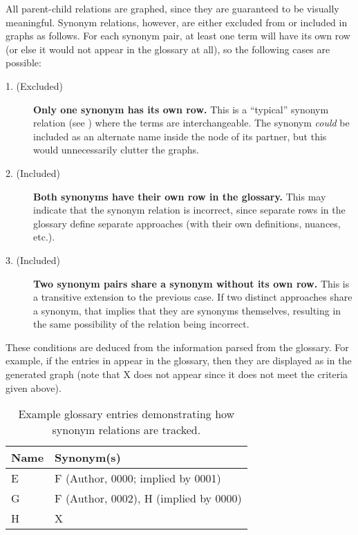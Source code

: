     \newpage\fi
All parent-child relations are graphed, since they are guaranteed to be
visually meaningful. Synonym relations, however, are either excluded from or
included in graphs as follows. For each synonym
pair, at least one term will have its own row (or else it would not appear in
the glossary at all), so the following cases are possible:
\begin{description}
    \item[1. (Excluded)] \ifnotpaper\else \hfill\break \fi
          \textbf{Only one synonym has its own row.}
          This is a ``typical'' synonym relation (see ) where
          the terms are interchangeable. The synonym \emph{could} be included
          as an alternate name inside the node of its partner, but this would
          unnecessarily clutter the graphs.

    \item[2. (Included)] \ifnotpaper\else \hfill\break \fi
          \textbf{Both synonyms have their own row in the glossary.}
          This may indicate that the synonym relation is
          incorrect, since separate rows in the glossary define separate
          approaches (with their own definitions, nuances, etc.).

    \item[3. (Included)] \ifnotpaper{}\label{case-three}
          \else\hfill\break\fi
          \textbf{Two synonym pairs share a synonym without its own row.}
          This is a transitive extension to the previous case. If
          two distinct approaches share a synonym, that implies that they are
          synonyms themselves, resulting in the same possibility of the
          relation being incorrect.
\end{description}
\ifnotpaper These conditions are deduced from the information parsed
    from the glossary. For example, if the entries in 
    appear in the glossary, then they are displayed as 
    in the generated graph (note that X does not appear since it does not
    meet the criteria given above).

    \begin{table}[hbtp!]
        \centering
        \begin{tabular}{ll} \hline
            Name & Synonym(s)                            \\ \hline
            E    & F (Author, 0000; implied by 0001)     \\
            G    & F (Author, 0002), H (implied by 0000) \\
            H    & X                                     \\ \hline
        \end{tabular}
        \caption{Example glossary entries demonstrating how synonym relations are tracked.}
        \label{tab:synExampleGlossary}
    \end{table}


